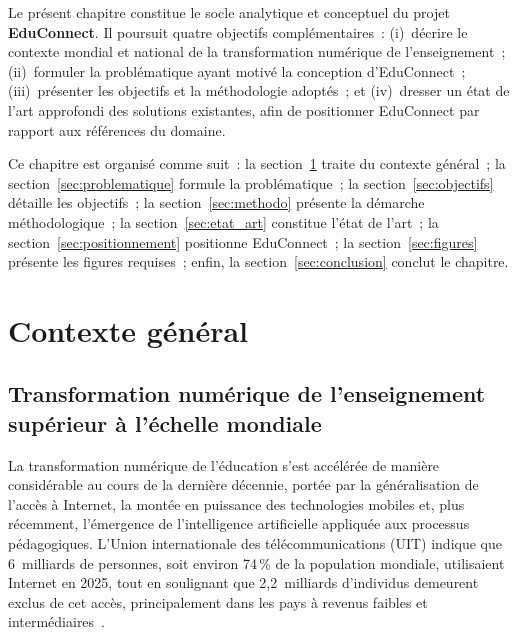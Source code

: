 ﻿\documentclass[12pt,a4paper,oneside]{report}
\begin{document}
Le pr\'esent chapitre constitue le socle analytique et conceptuel du projet \textbf{EduConnect}. Il poursuit quatre objectifs compl\'ementaires~: (i)~d\'ecrire le contexte mondial et national de la transformation num\'erique de l'enseignement~; (ii)~formuler la probl\'ematique ayant motiv\'e la conception d'EduConnect~; (iii)~pr\'esenter les objectifs et la m\'ethodologie adopt\'es~; et (iv)~dresser un \'etat de l'art approfondi des solutions existantes, afin de positionner EduConnect par rapport aux r\'ef\'erences du domaine.

Ce chapitre est organis\'e comme suit~: la section~\ref{sec:contexte} traite du contexte g\'en\'eral~; la section~\ref{sec:problematique} formule la probl\'ematique~; la section~\ref{sec:objectifs} d\'etaille les objectifs~; la section~\ref{sec:methodo} pr\'esente la d\'emarche m\'ethodologique~; la section~\ref{sec:etat_art} constitue l'\'etat de l'art~; la section~\ref{sec:positionnement} positionne EduConnect~; la section~\ref{sec:figures} pr\'esente les figures requises~; enfin, la section~\ref{sec:conclusion} conclut le chapitre.

\section{Contexte g\'en\'eral}
\label{sec:contexte}

\subsection{Transformation num\'erique de l'enseignement sup\'erieur \`a l'\'echelle mondiale}

La transformation num\'erique de l'\'education s'est acc\'el\'er\'ee de mani\`ere consid\'erable au cours de la derni\`ere d\'ecennie, port\'ee par la g\'en\'eralisation de l'acc\`es \`a Internet, la mont\'ee en puissance des technologies mobiles et, plus r\'ecemment, l'\'emergence de l'intelligence artificielle appliqu\'ee aux processus p\'edagogiques. L'Union internationale des t\'el\'ecommunications (UIT) indique que 6~milliards de personnes, soit environ 74\,\% de la population mondiale, utilisaient Internet en 2025, tout en soulignant que 2,2~milliards d'individus demeurent exclus de cet acc\`es, principalement dans les pays \`a revenus faibles et interm\'ediaires~\cite{itu_facts_2025}.
\end{document}
